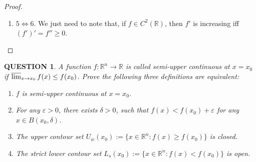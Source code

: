 \documentclass[12pt]{article}
\renewcommand{\(}{\left(}%
\renewcommand{\)}{\right)}%
\renewcommand{\[}{\left[}%
\renewcommand{\]}{\right]}%
\renewcommand{\r}{\mathbb{R}}
\newtheorem{question}{QUESTION}[section]}
\newtheorem{proof}{Proof.}}
\begin{document}
\begin{proof}
\begin{enumerate}
\begin{equation*}
		\end{equation*}
		For $\Leftarrow$, apply the mean value theorem of differential, we have
		\begin{equation*}
			\frac{f(x_2)-f(x_1)}{x_2-x_1}=f'(\xi),\quad \frac{f(x_3)-f(x_2)}{x_3-x_2}=f'(\eta),
		\end{equation*}
		where $x_1\leq \xi\leq x_2\leq \eta\leq x_3$. The increasing property of $f'$ yields the desired result.
		\item $5\Leftrightarrow6$. We just need to note that, if $f\in C^2(\r)$, then $f'$ is increasing iff $(f')'=f''\geq 0$.
	\end{enumerate}
\end{proof}

\begin{question}
	A function $f:\r^n\to\r$ is called semi-upper continuous at $x=x_0$ if $\varlimsup_{x\to x_0}f(x)\leq f(x_0)$. Prove the following three definitions are equivalent: 
	\begin{enumerate}
		\item $f$ is semi-upper continuous at $x=x_0$.
		\item For any $\varepsilon>0$, there exists $\delta>0$, such that $f(x)<f(x_0)+\varepsilon$ for any $x\in B(x_0,\delta)$.
		\item The upper contour set $U_w(x_0):=\{x\in\r^n:f(x)\geq f(x_0)\}$ is closed.
		\item The strict lower contour set $L_s(x_0):=\{x\in\r^n:f(x)< f(x_0)\}$ is open.
	\end{enumerate}
\end{question}
\end{document}
